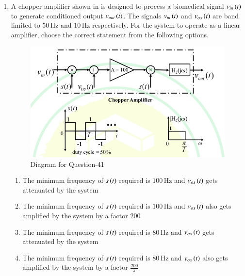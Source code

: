 \documentclass[journal,12pt,onecolumn]{IEEEtran}
\theoremstyle{remark}
\begin{document}
\begin{enumerate}
\item A chopper amplifier shown in  is designed to process a biomedical signal $v_{in}\left(t\right)$ to generate conditioned output $v_{out}\left(t\right)$. The signals $v_{in}\left(t\right)$ and $v_{os}\left(t\right)$ are band limited to $50\,\text{Hz}$ and $10\,\text{Hz}$ respectively. For the system to operate as a linear amplifier, choose the correct statement from the following options. \par\hfill{}
\begin{figure}[H]
\centering
\includegraphics[width=0.7\columnwidth]{Figs/Q-41.jpg}
\caption{Diagram for Question-41}
\label{41}
\end{figure}
\begin{enumerate}
\item The minimum frequency of $s\left(t\right)$ required is $100\,\text{Hz}$ and $v_{os}\left(t\right)$ gets attenuated by the system
\item The minimum frequency of $s\left(t\right)$ required is $100\,\text{Hz}$ and $v_{os}\left(t\right)$ also gets amplified by the system by a factor $200$
\item The minimum frequency of $s\left(t\right)$ required is $80\,\text{Hz}$ and $v_{os}\left(t\right)$ gets attenuated by the system
\item The minimum frequency of $s\left(t\right)$ required is $80\,\text{Hz}$ and $v_{os}\left(t\right)$ also gets amplified by the system by a factor $\tfrac{200}{\pi}$
\end{enumerate}



\end{enumerate}
\end{document}
